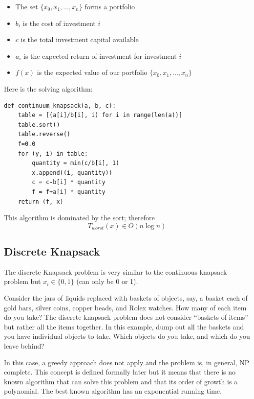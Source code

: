 \documentclass[justified, sixbynine]{tufte-book}
\def\ft{\small\tt}
\theoremstyle{plain}%
\newtheorem * {corollary}{Corollary}
\theoremstyle{definition}
\theoremstyle{remark}
\newtheorem * {remark}{Remark}
\newtheorem * {note}{Note}
\begin{document}
\begin{fullwidth}
\begin{itemize}
\item  The set $\{x_0, x_1, ..., x_n\}$ forms a portfolio

\item  $b_i$ is the cost of investment $i$

\item  $c$ is the total investment capital available

\item  $a_i$ is the expected return of investment for investment $i$

\item  $f(x)$ is the expected value of our portfolio $\{x_0, x_1, ..., x_n\}$
\end{itemize}

Here is the solving algorithm:

\begin{lstlisting}[caption={in file: {\ft nlib.py}}]
def continuum_knapsack(a, b, c):
    table = [(a[i]/b[i], i) for i in range(len(a))]
    table.sort()
    table.reverse()
    f=0.0
    for (y, i) in table:
        quantity = min(c/b[i], 1)
        x.append((i, quantity))
        c = c-b[i] * quantity
        f = f+a[i] * quantity
    return (f, x)
\end{lstlisting}

This algorithm is dominated by the sort; therefore
\begin{equation}
T_{worst}(x)\in O(n\log n)
\end{equation}

\subsection{Discrete Knapsack}

The discrete Knapsack problem is very similar to the continuous knapsack
problem but $x_i\in \{0, 1\}$ (can only be 0 or 1).

Consider the jars of liquids replaced with baskets of objects, say, a basket each of gold bars, silver coins, copper beads, and Rolex watches.  How many of each item do you take?  The discrete knapsack problem does not consider ``baskets of items'' but rather all the items together.  In this example, dump out all the baskets and you have individual objects to take.  Which objects do you take, and which do you leave behind?

In this case, a greedy approach does not apply and the problem is, in general, 
NP complete. This concept is defined formally later but it means that there is no known algorithm that can solve this problem and that its order of growth is a polynomial. The best known algorithm has an exponential running time.


\end{fullwidth}
\end{document}
